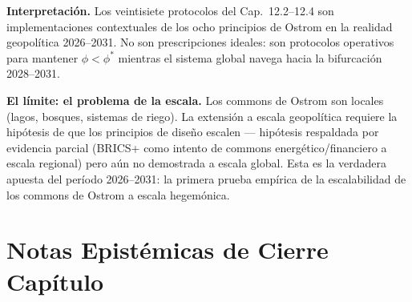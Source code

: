 \Proved{} \textbf{Interpretaci\'{o}n.} Los veintisiete protocolos del
Cap.~12.2--12.4 son implementaciones contextuales de los ocho principios
de Ostrom en la realidad geopol\'{i}tica 2026--2031. No son prescripciones
ideales: son protocolos operativos para mantener $\phi < \phi^*$ mientras
el sistema global navega hacia la bifurcaci\'{o}n 2028--2031.

\Hypoth{} \textbf{El l\'{i}mite: el problema de la escala.} Los commons de
Ostrom son locales (lagos, bosques, sistemas de riego). La extensi\'{o}n a
escala geopol\'{i}tica requiere la hip\'{o}tesis de que los principios de
dise\~{n}o escalen --- hip\'{o}tesis respaldada por evidencia parcial
(BRICS+ como intento de commons energ\'{e}tico/financiero a escala
regional) pero a\'{u}n no demostrada a escala global. Esta es la verdadera
apuesta del per\'{i}odo 2026--2031: la primera prueba emp\'{i}rica de la
escalabilidad de los commons de Ostrom a escala hegem\'{o}nica.



\section{Notas Epistémicas de Cierre
Capítulo}\label{note-epistemiche-di-chiusura-capítulo}


